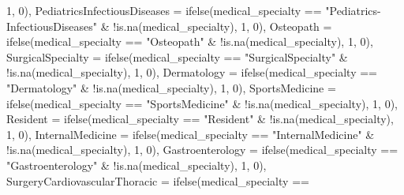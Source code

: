 \documentclass[
]{article}
\newenvironment{Shaded}{\begin{snugshade}}{\end{snugshade}}
\newcommand{\AttributeTok}[1]{\textcolor[rgb]{0.77,0.63,0.00}{#1}}
\newcommand{\DecValTok}[1]{\textcolor[rgb]{0.00,0.00,0.81}{#1}}
\newcommand{\FunctionTok}[1]{\textcolor[rgb]{0.00,0.00,0.00}{#1}}
\newcommand{\NormalTok}[1]{#1}
\newcommand{\SpecialCharTok}[1]{\textcolor[rgb]{0.00,0.00,0.00}{#1}}
\newcommand{\StringTok}[1]{\textcolor[rgb]{0.31,0.60,0.02}{#1}}
\begin{document}
\begin{Shaded}
\begin{Highlighting}[]
            \DecValTok{1}\NormalTok{, }\DecValTok{0}\NormalTok{), }\AttributeTok{PediatricsInfectiousDiseases =} \FunctionTok{ifelse}\NormalTok{(medical\_specialty }\SpecialCharTok{==}
            \StringTok{"Pediatrics{-}InfectiousDiseases"} \SpecialCharTok{\&} \SpecialCharTok{!}\FunctionTok{is.na}\NormalTok{(medical\_specialty),}
            \DecValTok{1}\NormalTok{, }\DecValTok{0}\NormalTok{), }\AttributeTok{Osteopath =} \FunctionTok{ifelse}\NormalTok{(medical\_specialty }\SpecialCharTok{==}
            \StringTok{"Osteopath"} \SpecialCharTok{\&} \SpecialCharTok{!}\FunctionTok{is.na}\NormalTok{(medical\_specialty),}
            \DecValTok{1}\NormalTok{, }\DecValTok{0}\NormalTok{), }\AttributeTok{SurgicalSpecialty =} \FunctionTok{ifelse}\NormalTok{(medical\_specialty }\SpecialCharTok{==}
            \StringTok{"SurgicalSpecialty"} \SpecialCharTok{\&} \SpecialCharTok{!}\FunctionTok{is.na}\NormalTok{(medical\_specialty),}
            \DecValTok{1}\NormalTok{, }\DecValTok{0}\NormalTok{), }\AttributeTok{Dermatology =} \FunctionTok{ifelse}\NormalTok{(medical\_specialty }\SpecialCharTok{==}
            \StringTok{"Dermatology"} \SpecialCharTok{\&} \SpecialCharTok{!}\FunctionTok{is.na}\NormalTok{(medical\_specialty),}
            \DecValTok{1}\NormalTok{, }\DecValTok{0}\NormalTok{), }\AttributeTok{SportsMedicine =} \FunctionTok{ifelse}\NormalTok{(medical\_specialty }\SpecialCharTok{==}
            \StringTok{"SportsMedicine"} \SpecialCharTok{\&} \SpecialCharTok{!}\FunctionTok{is.na}\NormalTok{(medical\_specialty),}
            \DecValTok{1}\NormalTok{, }\DecValTok{0}\NormalTok{), }\AttributeTok{Resident =} \FunctionTok{ifelse}\NormalTok{(medical\_specialty }\SpecialCharTok{==}
            \StringTok{"Resident"} \SpecialCharTok{\&} \SpecialCharTok{!}\FunctionTok{is.na}\NormalTok{(medical\_specialty),}
            \DecValTok{1}\NormalTok{, }\DecValTok{0}\NormalTok{), }\AttributeTok{InternalMedicine =} \FunctionTok{ifelse}\NormalTok{(medical\_specialty }\SpecialCharTok{==}
            \StringTok{"InternalMedicine"} \SpecialCharTok{\&} \SpecialCharTok{!}\FunctionTok{is.na}\NormalTok{(medical\_specialty),}
            \DecValTok{1}\NormalTok{, }\DecValTok{0}\NormalTok{), }\AttributeTok{Gastroenterology =} \FunctionTok{ifelse}\NormalTok{(medical\_specialty }\SpecialCharTok{==}
            \StringTok{"Gastroenterology"} \SpecialCharTok{\&} \SpecialCharTok{!}\FunctionTok{is.na}\NormalTok{(medical\_specialty),}
            \DecValTok{1}\NormalTok{, }\DecValTok{0}\NormalTok{), }\AttributeTok{SurgeryCardiovascularThoracic =} \FunctionTok{ifelse}\NormalTok{(medical\_specialty }\SpecialCharTok{==}

\end{Highlighting}
\end{Shaded}
\end{document}
